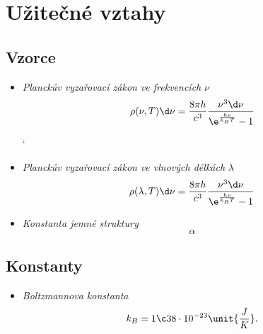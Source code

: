 \section{Užitečné vztahy}

\subsection{Vzorce}
\begin{itemize}
`  \item \emph{Planckův vyzařovací zákon ve frekvencích} $\nu$
        \begin{equation}
            \rho(\nu,T)\d\nu=\frac{8\pi h}{c^{3}}\frac{\nu^{3}\d\nu}{\e^{\frac{h\nu}{k_{B}T}}-1}
        \end{equation}

`  \item \emph{Planckův vyzařovací zákon ve vlnových délkách} $\lambda$
        \begin{equation}
            \rho(\lambda,T)\d\nu=\frac{8\pi h}{c^{3}}\frac{\nu^{3}\d\nu}{\e^{\frac{h\nu}{k_{B}T}}-1}
        \end{equation}

    \item \emph{Konstanta jemné struktury}
        \begin{equation}
            \alpha
        \end{equation}
\end{itemize}

\subsection{Konstanty}
\begin{itemize}
    \item \emph{Boltzmannova konstanta}
        \begin{equation}
            k_{B}=1\c38\cdot10^{-23}\unit{\frac{J}{K}}.
        \end{equation}
\end{itemize}